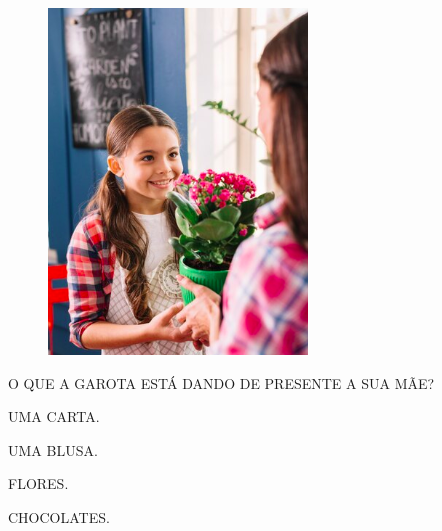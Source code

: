 \begin{minipage}{.4\textwidth}
\begin{figure}[H]
\includegraphics[width=\textwidth]{media/image175b.png}
\end{figure}
\end{minipage}
\hspace{.5cm}
\begin{minipage}{.6\textwidth}
O QUE A GAROTA ESTÁ DANDO DE PRESENTE A SUA MÃE?

\begin{escolha}
\item UMA CARTA.

\item UMA BLUSA.

\item FLORES.

\item CHOCOLATES.
\end{escolha}
\end{minipage}

